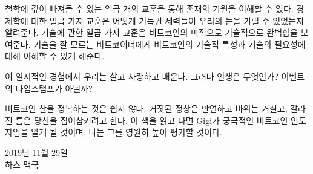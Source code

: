 철학에 깊이 빠져들 수 있는 일곱 개의 교훈을 통해 존재의 기원을 이해할 수 있다. 
경제학에 대한 일곱 가지 교훈은 어떻게 기득권 세력들이 우리의 눈을 가릴 수 있었는지 알려준다. 
기술에 관한 일곱 가지 교훈은 비트코인의 미적으로 기술적으로 완벽함을 보여준다.
기술을 잘 모르는 비트코이너에게 비트코인의 기술적 특성과 기술의 필요성에 대해 이해할 수 있게 해준다.


이 일시적인 경험에서 우리는 살고 사랑하고 배운다. 
그러나 인생은 무엇인가? 이벤트의 타임스탬프가 아닐까?


비트코인 산을 정복하는 것은 쉽지 않다. 
거짓된 정상은 만연하고 바위는 거칠고, 갈라진 틈은 당신을 집어삼키려고 한다.
이 책을 읽고 나면 Gigi가 궁극적인 비트코인 인도자임을 알게 될 것이며, 
나는 그를 영원히 높이 평가할 것이다.


\begin{flushright}
	2019년 11월 29일 \\
	하스 맥쿡
\end{flushright}
